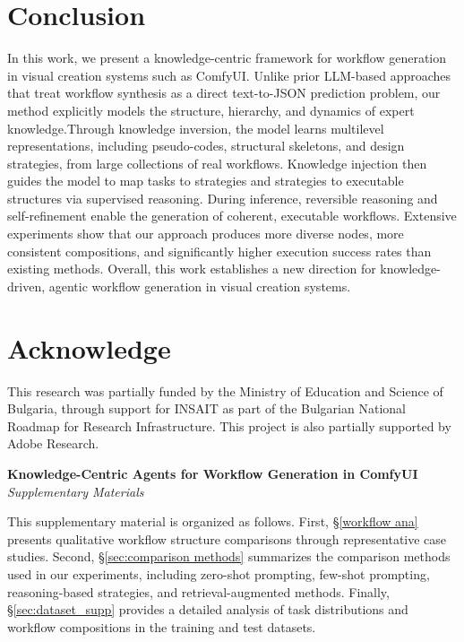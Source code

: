 \documentclass[runningheads]{llncs}
\begin{document}
\section{Conclusion}
In this work, we present a knowledge-centric framework for workflow generation in visual creation systems such as ComfyUI. Unlike prior LLM-based approaches that treat workflow synthesis as a direct text-to-JSON prediction problem, our method explicitly models the structure, hierarchy, and dynamics of expert knowledge.Through knowledge inversion, the model learns multilevel representations, including pseudo-codes, structural skeletons, and design strategies, from large collections of real workflows. Knowledge injection then guides the model to map tasks to strategies and strategies to executable structures via supervised reasoning. During inference, reversible reasoning and self-refinement enable the generation of coherent, executable workflows. Extensive experiments show that our approach produces more diverse nodes, more consistent compositions, and significantly higher execution success rates than existing methods. Overall, this work establishes a new direction for knowledge-driven, agentic workflow generation in visual creation systems.

\section*{Acknowledge}
This research was partially funded by the Ministry of Education and Science of Bulgaria, through support for INSAIT as part of the Bulgarian National Roadmap for Research Infrastructure. This project is also partially supported by Adobe Research.



%
%





\clearpage

\begin{center}
{\LARGE\bfseries Knowledge-Centric Agents for Workflow Generation in ComfyUI}\\[0.5em]
{\Large\itshape Supplementary Materials}
\end{center}

\vspace{1em}

\appendix

This supplementary material is organized as follows.
First, \S\ref{workflow ana} presents qualitative workflow structure comparisons through representative case studies.
Second, \S\ref{sec:comparison methods} summarizes the comparison methods used in our experiments, including zero-shot prompting, few-shot prompting, reasoning-based strategies, and retrieval-augmented methods.
Finally, \S\ref{sec:dataset_supp} provides a detailed analysis of task distributions and workflow compositions in the training and test datasets.
\end{document}
